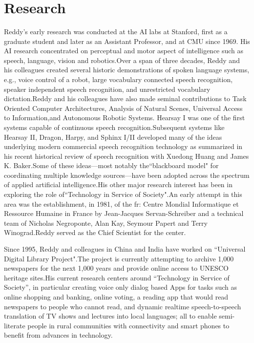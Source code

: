 \documentclass[a4paper,10pt]{article}
\begin{document}
\section{Research}
\paragraph{}
  Reddy's early research was conducted at the AI labs at Stanford, first as 
  a graduate student and later as an Assistant Professor, and at CMU since 1969.
  His AI research concentrated on perceptual and motor aspect of intelligence 
  such as speech, language, vision and robotics.Over a span of three decades, 
  Reddy and his colleagues created several historic demonstrations of spoken 
  language systems, e.g., voice control of a robot, large vocabulary connected
  speech recognition, speaker independent speech recognition, and unrestricted 
  vocabulary dictation.Reddy and his colleagues have also made seminal 
  contributions to Task Oriented Computer Architectures, Analysis of Natural 
  Scenes, Universal Access to Information,and Autonomous Robotic Systems.
  Hearsay I was one of the first systems capable of continuous speech 
  recognition.Subsequent systems like Hearsay II, Dragon, Harpy, and 
  Sphinx I/II developed many of the ideas underlying modern commercial speech 
  recognition technology as summarized in his recent historical review of 
  speech recognition with Xuedong Huang and James K. Baker.Some of these 
  ideas—most notably the``blackboard model" for coordinating multiple knowledge
  sources—have been adopted across the spectrum of applied artificial 
  intelligence.His other major research interest has been in exploring the 
  role of``Technology in Service of Society".An early attempt in this area 
  was the establishment, in 1981, of the fr: Centre Mondial Informatique et 
  Ressource Humaine in France by Jean-Jacques Servan-Schreiber and a 
  technical team of Nicholas Negroponte, Alan Kay, Seymour Papert and 
  Terry Winograd.Reddy served as the Chief Scientist for the center.
  
  Since 1995, Reddy and colleagues in China and India have worked on 
 ``Universal Digital Library Project".The project is currently attempting 
  to archive 1,000 newspapers for the next 1,000 years and provide online 
  access to UNESCO heritage sites.His current research centers around 
 ``Technology in Service of Society”, in particular creating voice only 
  dialog based Apps for tasks such as online shopping and banking, online
  voting, a reading app that would read newspapers to people who cannot 
  read, and dynamic realtime speech-to-speech translation of TV shows and 
  lectures into local languages; all to enable semi-literate people in rural
  communities with connectivity and smart phones to benefit from advances in
  technology.
    
\end{document}
